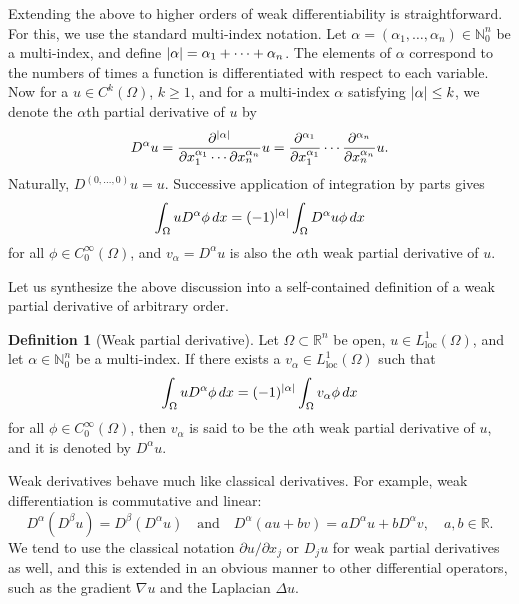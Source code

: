 \documentclass[english, 12pt, a4paper, sci, utf8, a-2b, online]{aaltothesis}
\theoremstyle{definition}
\newtheorem{definition}{Definition}[section]
\theoremstyle{plain}
\DeclarePairedDelimiter\abs{\lvert}{\rvert}
\newcommand*\diff{\mathop{}\!d}
\numberwithin{equation}{section}
\begin{document}
Extending the above to higher orders
of weak differentiability is straightforward.
For this, we use the standard multi-index notation.
Let $\alpha = (\alpha_1,\dotsc,\alpha_n) \in \mathbb{N}_0^n$
be a multi-index, and define
$\abs{\alpha} = \alpha_1 + \dotsb + \alpha_n$. The elements of $\alpha$
correspond to the numbers of times a function is differentiated
with respect to each variable. Now for a $u \in C^k(\Omega)$, $k \geq 1$,
and for a multi-index $\alpha$ satisfying
$\abs{\alpha} \leq k$, we denote the $\alpha$th partial derivative of $u$ by
\begin{equation*}
    D^{\alpha} u
    = \frac{\partial^{\abs{\alpha}}}
        {\partial x_1^{\alpha_1} \dotsb \partial x_n^{\alpha_n}} u
    = \frac{\partial^{\alpha_1}}{\partial x_1^{\alpha_1}} \dotsb
        \frac{\partial^{\alpha_n}}{\partial x_n^{\alpha_n}} u.
\end{equation*}
Naturally, $D^{(0,\dotsc,0)}u=u$.
Successive application of integration by parts gives
\begin{equation*}
    \int_{\Omega} u D^{\alpha} \phi \diff x
    = (-1)^{\abs{\alpha}} \int_{\Omega} D^{\alpha} u \phi \diff x
\end{equation*}
for all $\phi \in C_0^{\infty}(\Omega)$, and $v_{\alpha} = D^{\alpha} u$
is also the $\alpha$th weak partial derivative of $u$.

Let us synthesize the above discussion into a self-contained definition
of a weak partial derivative of arbitrary order.
\begin{definition}[Weak partial derivative]
    \label{def:weakderivative}
    Let $\Omega \subset \mathbb{R}^n$ be open,
    $u \in L_{\text{loc}}^1(\Omega)$, and let 
    $\alpha \in \mathbb{N}_0^n$ be a multi-index. If there exists
    a $v_{\alpha} \in L_{\text{loc}}^1(\Omega)$ such that
    \begin{equation*}
        \int_{\Omega} u D^{\alpha} \phi \diff x
        = (-1)^{\abs{\alpha}} \int_{\Omega} v_{\alpha} \phi \diff x
    \end{equation*}
    for all $\phi \in C_0^{\infty}(\Omega)$, then
    $v_{\alpha}$ is said to be the $\alpha$th weak partial derivative of $u$,
    and it is denoted by $D^{\alpha} u$.
\end{definition}
Weak derivatives behave much like classical derivatives.
For example, weak differentiation is commutative and linear:
\begin{equation*}
    D^{\alpha}(D^{\beta} u) = D^{\beta}(D^{\alpha} u)
    \quad \text{and} \quad
    D^{\alpha}(a u + b v) = a D^{\alpha}u + b D^{\alpha}v,
    \quad a,b \in \mathbb{R}.
\end{equation*}
We tend to use the classical notation $\partial u / \partial x_j$
or $D_j u$ for weak partial derivatives as well,
and this is extended in an obvious manner to other
differential operators, such as the gradient $\nabla u$ and the Laplacian $\Delta u$.
\end{document}
